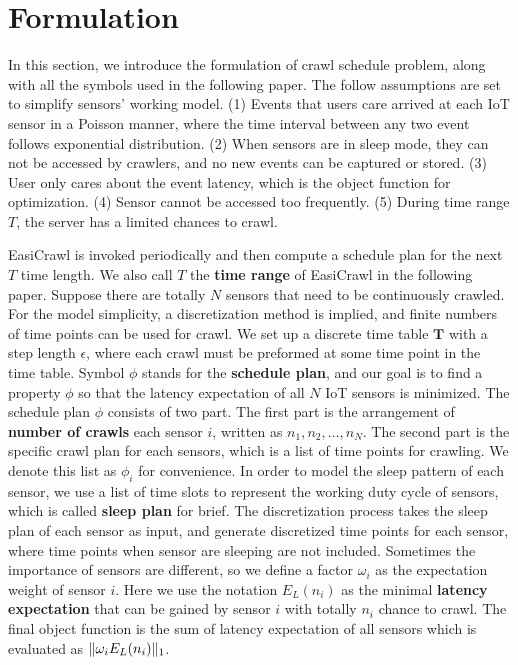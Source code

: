 \documentclass[conference]{IEEEtran}
\begin{document}
\section{Formulation}\label{formulation}

In this section, we introduce the formulation of crawl schedule problem, along with all the symbols used in the following paper. The follow assumptions are set to simplify sensors' working model.
(1) Events that users care arrived at each IoT sensor in a Poisson manner, where the time interval between any two event follows exponential distribution. 
(2) When sensors are in sleep mode, they can not be accessed by crawlers, and no new events can be captured or stored.
(3) User only cares about the event latency, which is the object function for optimization.
(4) Sensor cannot be accessed too frequently.
(5) During time range $T$, the server has a limited chances to crawl.

EasiCrawl is invoked periodically and then compute a schedule plan for the next $T$ time length.
We also call $T$ the \textbf{time range} of EasiCrawl in the following paper.
Suppose there are totally $N$ sensors that need to be continuously crawled.
For the model simplicity, a discretization method is implied, and finite numbers of time points can be used for crawl.
We set up a discrete time table $\mathbf{T}$ with a step length $\epsilon$, where each crawl must be preformed at some time point in the time table.
Symbol $\phi$ stands for the \textbf{schedule plan}, and our goal is to find a property $\phi$ so that the latency expectation of all $N$ IoT sensors is minimized. 
The schedule plan $\phi$ consists of two part. The first part is the arrangement of \textbf{number of crawls} each sensor $i$, written as $n_1,n_2,\ldots,n_{N}$. The second part is the specific crawl plan for each sensors, which is a list of time points for crawling. We denote this list as $\phi_{i}$ for convenience.
In order to model the sleep pattern of each sensor, we use a list of time slots to represent the working duty cycle of sensors, which is called \textbf{sleep plan} for brief. 
The discretization process takes the sleep plan of each sensor as input, and generate discretized time points for each sensor, where time points when sensor are sleeping are not included.
Sometimes the importance of sensors are different, so we define a factor $\omega_i$ as the expectation weight of sensor $i$. 
Here we use the notation $E_{L}(n_{i})$ as the minimal \textbf{latency expectation} that can be gained by sensor $i$ with totally $n_i$ chance to crawl.
The final object function is the sum of latency expectation of all sensors which is evaluated as $\Arrowvert \omega_i E_{L}(n_{i}) \Arrowvert_{1}$.
\end{document}
